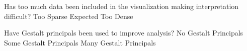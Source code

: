 \documentclass[a4paper,12pt]{article}
\begin{document}
	{Has too much data been included in the visualization making 
    	interpretation difficult? } 
	{\choice Too Sparse}
	{\choice Expected}
	{\choice Too Dense} 
        
	{Have Gestalt principals been used to improve analysis?}
	{\choice No Gestalt Principals}
	{\choice Some Gestalt Principals}
	{\choice Many Gestalt Principals} 
        
\EndTable  
 
\end{document}
